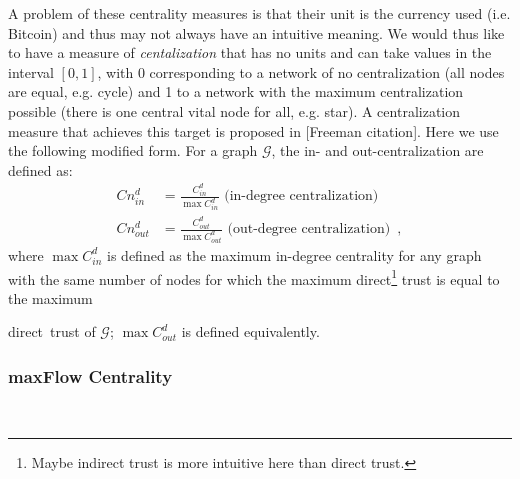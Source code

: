     A problem of these centrality measures is that their unit is the currency used (i.e. Bitcoin) and thus may not always have
    an intuitive meaning. We would thus like to have a measure of \textit{centalization} that has no units and can take values
    in the interval $\left[0,1\right]$, with 0 corresponding to a network of no centralization (all nodes are equal, e.g.
    cycle) and 1 to a network with the maximum centralization possible (there is one central vital node for all, e.g. star). A
    centralization measure that achieves this target is proposed in [Freeman citation]. Here we use the following modified
    form. For a graph $\mathcal{G}$, the in- and out-centralization are defined as:
    \begin{align*}
      Cn^d_{in} &= \frac{C^d_{in}}{\max C^d_{in}} \mbox{ (in-degree centralization)} \\
      Cn^d_{out} &= \frac{C^d_{out}}{\max C^d_{out}} \mbox{ (out-degree centralization)} \enspace,
    \end{align*}
    where $\max C^d_{in}$ is defined as the maximum in-degree centrality for any graph with the same number of nodes for which
    the maximum direct\footnote{Maybe indirect trust is more intuitive here than direct trust.} trust is equal to the maximum
    \addtocounter{footnote}{-1} direct\footnotemark \ trust of $\mathcal{G}$; $\max C^d_{out}$ is defined equivalently.

  \subsubsection{maxFlow Centrality} \ \\

